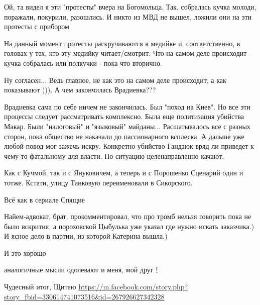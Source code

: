 \begin{itemize}

Ой, та видел я эти "протесты" вчера на Богомольца. Так, собралась кучка молоди,
поражали, покурили, разошлись. И никто из МВД не вышел, ложили они на эти
протесты с прибором

\begin{itemize} %

На данный момент протесты раскручиваются в медийке и, соответственно, в головах
у тех, кто эту медийку читает/смотрит. Что на самом деле происходит - кучка
собралась или полкучки - пока что вторично.


Ну согласен... Ведь главное, не как это на самом деле происходит, а как показывают ))). А чем закончилась Врадиевка???


Врадиевка сама по себе ничем не закончилась. Был "поход на Киев". Но все эти
процессы следует рассматривать комплексно. Была еще политизация убийства Макар.
Были "налоговый" и "языковый" майданы... Расшатывалось все с разных сторон,
пока общество не накачали до пассионарного всплеска. А дальше уже любой повод
мог зажечь искру. Конкретно убийство Гандзюк вряд ли приведет к чему-то
фатальному для власти. Но ситуацию целенаправленно качают.

\end{itemize} %

Как с Кучмой, так и с Януковичем, а теперь и с Порошенко Сценарий один и тотже. Кстати, улицу Танковую переименовали в Сикорского.

Всё как в сериале Спящие


Найем-адвокат, брат, прокомментировал, что про тромб нельзя говорить пока не
было вскрития, а пороховской Цыбулька уже указал где нужно искать заказчика.) И
ясное дело в партии, из которой Катерина вышла.)


И это хорошо

аналогичные мысли одолевают и меня, мой друг！

Чудесный итог, Щитаю
\url{https://m.facebook.com/story.php?story_fbid=330614741073516&id=267926627342328}

\end{itemize} %
